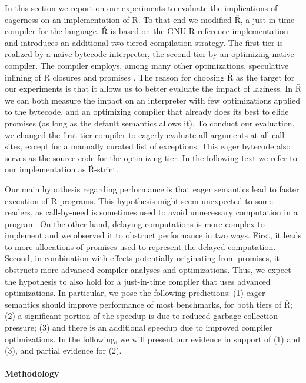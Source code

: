 \documentclass[review,nonacm,screen,acmsmall,anonymous=true]{acmart}
\renewcommand{\Rsh}{{\sf\v R}\xspace}
\newcommand{\Rshstrict}{{\sf\v R-strict}\xspace}
\begin{document}
In this section we report on our experiments to evaluate the implications of
eagerness on an implementation of R. To that end we modified \Rsh, a just-in-time
compiler for the language. \Rsh is based on the GNU R reference implementation
and introduces an additional two-tiered compilation strategy. The
first tier is realized by a naive bytecode interpreter, the second tier
by an optimizing native compiler. The compiler employs, among many other
optimizations, speculative inlining of R closures and promises \citep{dls19,
oopsla20c}.
The reason for choosing \Rsh as the target for our
experiments is that it allows us to better evaluate the impact of laziness. In
\Rsh we can both measure the impact on an interpreter with few optimizations
applied to the bytecode, and an optimizing compiler that already does its best
to elide promises (as long as the default semantics allows it).
To conduct our evaluation, we changed the first-tier
compiler to eagerly evaluate all arguments at all call-sites, except for a
manually curated list of exceptions. This eager bytecode also serves as the source
code for the optimizing tier. In the following text we refer
to our implementation as \Rshstrict.

Our main hypothesis regarding performance is that eager semantics lead to faster
execution of R programs. This hypothesis might seem unexpected to some readers,
as call-by-need is sometimes used to avoid unnecessary computation in a program.
On the other hand, delaying computations is more complex to implement and we
observed it to obstruct performance in two ways. First, it leads to more
allocations of promises used to represent the delayed computation. Second, in
combination with effects potentially originating from promises, it obstructs
more advanced compiler analyses and optimizations. Thus, we expect the hypothesis
to also hold for a just-in-time compiler that uses advanced optimizations.
In particular, we pose the following predictions:
(1) eager semantics should improve performance of most benchmarks, for both tiers
of \Rsh; (2) a significant portion of the speedup is due to reduced garbage
collection pressure; (3) and there is an additional speedup due to improved compiler
optimizations. In the following, we will present our evidence in support of (1)
and (3), and partial evidence for (2).

\paragraph{Methodology}
\end{document}
